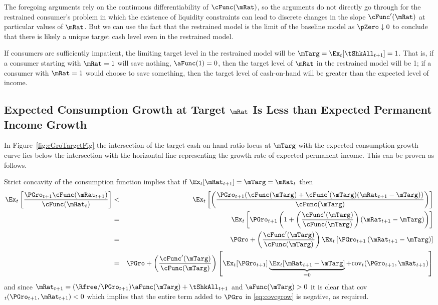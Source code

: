 \documentclass[titlepage]{\econtex}\providecommand{\texname}{BufferStockTheory}
\begin{document}
{The foregoing arguments rely on the continuous differentiability of
$\cFunc(\mRat)$, so the arguments do not directly go through for the
restrained consumer's problem in which the existence of liquidity
constraints can lead to discrete changes in the slope
$\cFunc^{\prime}(\mRat)$ at particular values of $\mRat$. But we can
use the fact that the restrained model is the limit of the baseline
model as $\pZero \downarrow 0$ to conclude that there is likely a
unique target cash level even in the restrained model.

If consumers are sufficiently impatient, the limiting target level in the
restrained model will be $\mTarg = \Ex_{t}[{\tShkAll}_{t+1}] = 1$. That
is, if a consumer starting with $\mRat = 1$ will save nothing, ${\aFunc}(1)=0$,
then the target level of $\mRat$ in the restrained model will be 1; if a
consumer with $\mRat=1$ would choose to save something, then the target
level of cash-on-hand will be greater than the expected level of income.

\hypertarget{cGroLTpGro}{}
\subsection{Expected Consumption Growth at Target $\mRat$ Is Less than
Expected Permanent Income Growth}

\label{subsec:expcgrowth} In Figure~\ref{fig:cGroTargetFig} the intersection of
the target cash-on-hand ratio locus at $\mTarg$ with the expected consumption
growth curve lies below the intersection with the horizontal line
representing the growth rate of expected permanent income. This can be
proven as follows.

Strict concavity of the consumption function implies that if $\Ex_{t}[{\mRat}%
_{t+1}] = \mTarg = \mRat_{t}$ then
\begin{eqnarray}
\Ex_{t}\left[\frac{{\PGro}_{t+1} \cFunc({\mRat}_{t+1})}{\cFunc(\mRat_{t})}
\right] & < & \Ex_{t}\left[\left(\frac{{\PGro}_{t+1}
(\cFunc(\mTarg)+\cFunc^{\prime}(\mTarg)({\mRat}_{t+1}-\mTarg))}{\cFunc(\mTarg)}\right)\right]  \nonumber
\\
& = & \Ex_{t}\left[{\PGro}_{t+1} \left(1+\left(\frac{\cFunc^{\prime}(\mTarg)}{%
\cFunc(\mTarg)}\right)({\mRat}_{t+1}-\mTarg)\right)\right]  \nonumber  \\
& = & \PGro + \left(\frac{\cFunc^{\prime}(\mTarg)}{\cFunc(\mTarg)}\right)\Ex_{t}\left[ {\PGro}_{t+1}\left({\mRat}_{t+1}-\mTarg\right)\right]  \nonumber \\
& = & \PGro + \left(\frac{\cFunc^{\prime}(\mTarg)}{\cFunc(\mTarg)}\right)\left[
\Ex_{t}[ \PGro_{t+1}]\underbrace{\Ex_{t}[
{\mRat}_{t+1}-\mTarg]}_{=0}+\mbox{cov}_{t}( {\PGro}_{t+1},{\mRat}_{t+1})\right]
 \label{eq:covcgrow}
\end{eqnarray}
and since $\mRat_{t+1} = (\Rfree/\PGro_{t+1}) \aFunc(\mTarg)+\tShkAll_{t+1}$ and
$\aFunc(\mTarg)>0$ it is clear that
cov$_{t}({\PGro}_{t+1},{\mRat}_{t+1})<0$ which implies that
the entire term added to $\PGro$ in \eqref{eq:covcgrow} is negative, as
required.

}
\end{document}
